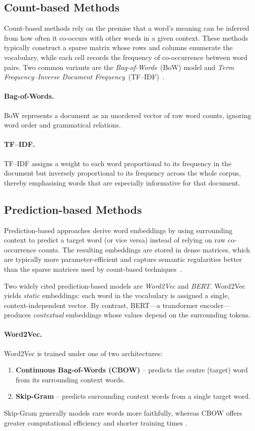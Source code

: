 \documentclass{SGGW-thesis-EN}
\begin{document}
\subsection{Count-based Methods}

Count-based methods rely on the premise that a word’s meaning can be inferred from how often it
co-occurs with other words in a given context.
These methods typically construct a sparse matrix whose rows and columns enumerate the
vocabulary, while each cell records the frequency of co-occurrence between word pairs.
Two common variants are the \textit{Bag-of-Words}~(BoW) model and \textit{Term Frequency–Inverse
Document Frequency}~(TF–IDF)~\cite{jurafsky2023slp3}.
\paragraph{Bag-of-Words.}
BoW represents a document as an unordered vector of raw word counts, ignoring word order and
grammatical relations.

\paragraph{TF–IDF.}
TF–IDF assigns a weight to each word proportional to its frequency in the document but inversely
proportional to its frequency across the whole corpus, thereby emphasising words that are
especially informative for that document.
\subsection{Prediction-based Methods}
Prediction-based approaches derive word embeddings by using surrounding context to predict a target word (or vice versa) instead of relying on raw co-occurrence counts.
The resulting embeddings are stored in dense matrices, which are typically more
parameter-efficient and capture semantic regularities better than the sparse matrices used by
count-based techniques~\cite{jurafsky2023slp3}.

Two widely cited prediction-based models are \textit{Word2Vec} and \textit{BERT}.
Word2Vec yields \emph{static} embeddings: each word in the vocabulary is assigned a single,
context-independent vector.
By contrast, BERT—a transformer encoder—produces \emph{contextual} embeddings whose values depend
on the surrounding tokens.

\paragraph{Word2Vec.}
Word2Vec is trained under one of two architectures:
\begin{enumerate}
  \item \textbf{Continuous Bag-of-Words (CBOW)} – predicts the centre (target) word from its surrounding
        context words.
  \item \textbf{Skip-Gram} – predicts surrounding context words from a single target word.
\end{enumerate}
Skip-Gram generally models rare words more faithfully, whereas CBOW offers greater computational
efficiency and shorter training times \cite{mikolov2013distributed}.
\end{document}
